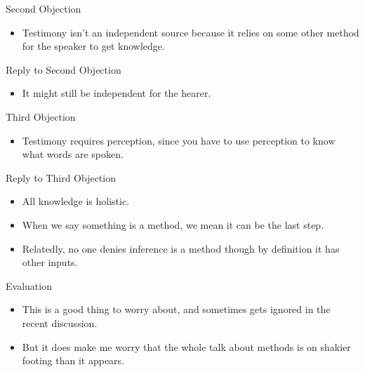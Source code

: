 \documentclass[
  17pt,
  letterpaper,
  ignorenonframetext,
  aspectratio=169,
  handout]{beamer}
\providecommand{\tightlist}{%
  \setlength{\itemsep}{0pt}\setlength{\parskip}{0pt}}\usepackage{longtable,booktabs,array}
\begin{document}
\begin{frame}{Second Objection}
\protect\hypertarget{second-objection}{}
\begin{itemize}[<+->]
\tightlist
\item
  Testimony isn't an independent source because it relies on some other
  method for the speaker to get knowledge.
\end{itemize}
\end{frame}

\begin{frame}{Reply to Second Objection}
\protect\hypertarget{reply-to-second-objection}{}
\begin{itemize}[<+->]
\tightlist
\item
  It might still be independent for the hearer.
\end{itemize}
\end{frame}

\begin{frame}{Third Objection}
\protect\hypertarget{third-objection}{}
\begin{itemize}[<+->]
\tightlist
\item
  Testimony requires perception, since you have to use perception to
  know what words are spoken.
\end{itemize}
\end{frame}

\begin{frame}{Reply to Third Objection}
\protect\hypertarget{reply-to-third-objection}{}
\begin{itemize}[<+->]
\tightlist
\item
  All knowledge is holistic.
\item
  When we say something is a method, we mean it can be the last step.
\item
  Relatedly, no one denies inference is a method though by definition it
  has other inputs.
\end{itemize}
\end{frame}

\begin{frame}{Evaluation}
\protect\hypertarget{evaluation}{}
\begin{itemize}[<+->]
\tightlist
\item
  This is a good thing to worry about, and sometimes gets ignored in the
  recent discussion.
\item
  But it does make me worry that the whole talk about methods is on
  shakier footing than it appears.
\end{itemize}
\end{frame}
\end{document}
